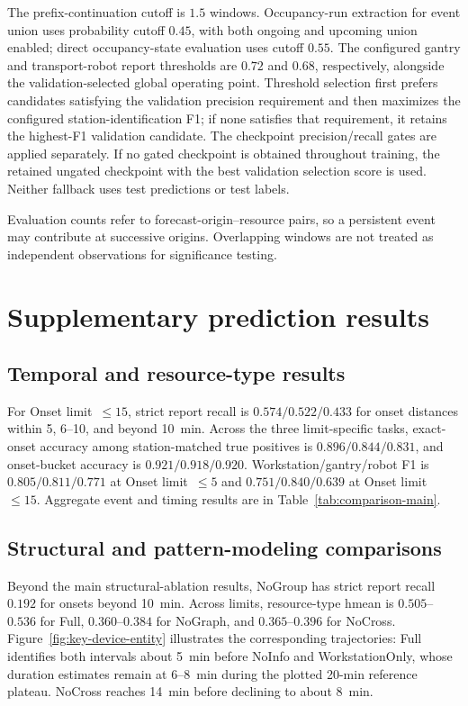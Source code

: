 \documentclass[a4paper,fleqn]{cas-dc}
\begin{document}
The prefix-continuation cutoff is $1.5$ windows. Occupancy-run extraction for event union uses probability cutoff $0.45$, with both ongoing and upcoming union enabled; direct occupancy-state evaluation uses cutoff $0.55$. The configured gantry and transport-robot report thresholds are $0.72$ and $0.68$, respectively, alongside the validation-selected global operating point. Threshold selection first prefers candidates satisfying the validation precision requirement and then maximizes the configured station-identification F1; if none satisfies that requirement, it retains the highest-F1 validation candidate. The checkpoint precision/recall gates are applied separately. If no gated checkpoint is obtained throughout training, the retained ungated checkpoint with the best validation selection score is used. Neither fallback uses test predictions or test labels.

Evaluation counts refer to forecast-origin--resource pairs, so a persistent event may contribute at successive origins. Overlapping windows are not treated as independent observations for significance testing.

\section{Supplementary prediction results}\label{app:supplementary-results}

\subsection{Temporal and resource-type results}



For Onset limit~$\leq15$, strict report recall is $0.574/0.522/0.433$ for onset distances within 5, 6--10, and beyond 10~min. Across the three limit-specific tasks, exact-onset accuracy among station-matched true positives is $0.896/0.844/0.831$, and onset-bucket accuracy is $0.921/0.918/0.920$. Workstation/gantry/robot F1 is $0.805/0.811/0.771$ at Onset limit~$\leq5$ and $0.751/0.840/0.639$ at Onset limit~$\leq15$. Aggregate event and timing results are in Table~\ref{tab:comparison-main}.

\subsection{Structural and pattern-modeling comparisons}

Beyond the main structural-ablation results, NoGroup has strict report recall $0.192$ for onsets beyond 10~min. Across limits, resource-type hmean is $0.505$--$0.536$ for Full, $0.360$--$0.384$ for NoGraph, and $0.365$--$0.396$ for NoCross. Figure~\ref{fig:key-device-entity} illustrates the corresponding trajectories: Full identifies both intervals about 5~min before NoInfo and WorkstationOnly, whose duration estimates remain at 6--8~min during the plotted 20-min reference plateau. NoCross reaches 14~min before declining to about 8~min.
\end{document}

